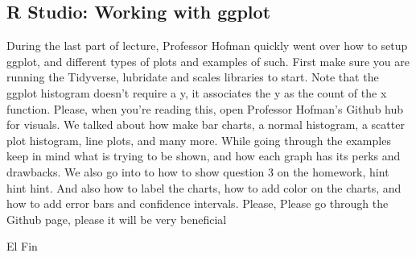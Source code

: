 \subsection{R Studio: Working with ggplot}
During the last part of lecture, Professor Hofman quickly went over how to setup ggplot, and different types of plots and examples of such. First make sure you are running the Tidyverse, lubridate and scales libraries to start. Note that the ggplot histogram doesn't require a y, it associates the y as the count of the x function. Please, when you're reading this, open Professor Hofman's Github hub for visuals. We talked about how make bar charts, a normal histogram, a scatter plot histogram, line plots, and many more. While going through the examples keep in mind what is trying to be shown, and how each graph has its perks and drawbacks. We also go into to how to show question 3 on the homework, hint hint hint. And also how to label the charts, how to add color on the charts, and how to add error bars and confidence intervals. Please, Please go through the Github page, please it will be very beneficial



El Fin

   



